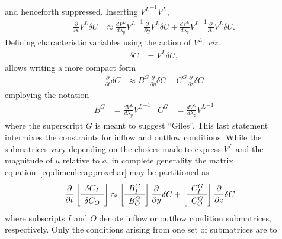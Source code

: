 and henceforth suppressed.  Inserting ${V^L}^{-1} V^L$,
\begin{align}
  \frac{\partial}{\partial{}t}
  V^L
  \delta{}U
  &\approx
  \frac{dV^L}{d\lambda_y}
  {V^L}^{-1}
  \frac{\partial}{\partial{}y}
  V^L
  \delta{}U
  +
  \frac{dV^L}{d\lambda_z}
  {V^L}^{-1}
  \frac{\partial}{\partial{}z}
  V^L
  \delta{}U
.
\end{align}
Defining characteristic variables using the action of $V^L$, \textit{viz.}
\begin{align}
  \delta{}C &= V^L \delta{}U
  ,
\end{align}
allows writing a more compact form
\begin{align}
\label{eq:dimeulerapproxchar}
  \frac{\partial}{\partial{}t}
  \delta{}C
  &\approx
  B^G
  \frac{\partial}{\partial{}y}
  \delta{}C
  +
  C^G
  \frac{\partial}{\partial{}z}
  \delta{}C
\end{align}
employing the notation
\begin{align}
\label{eq:dimeulerapproxBG}
  B^G
&=
  \frac{dV^L}{d\lambda_y}
  {V^L}^{-1}
&
  C^G
&=
  \frac{dV^L}{d\lambda_z}
  {V^L}^{-1}
\end{align}
where the superscript $G$ is meant to suggest ``Giles''.  This last statement
intermixes the constraints for inflow and outflow conditions.  While the
submatrices vary depending on the choices made to express $V^L$ and the
magnitude of $\bar{u}$ relative to $\bar{a}$, in complete generality the matrix
equation~\eqref{eq:dimeulerapproxchar} may be partitioned as
\begin{align}
\label{eq:dimeulerapproxcharpart}
\renewcommand*{\arraystretch}{1.2}
  \frac{\partial}{\partial{}t}
  \left[\begin{array}{c}\delta{}C_{I}\\\hline\delta{}C_{O}\end{array}\right]
  &\approx
\renewcommand*{\arraystretch}{1.2}
  \left[\begin{array}{c} B^G_{I} \\ \hline B^G_{O} \end{array}\right]
  \frac{\partial}{\partial{}y}
  \delta{}C
  +
  \left[\begin{array}{c} C^G_{I} \\ \hline C^G_{O} \end{array}\right]
  \frac{\partial}{\partial{}z}
  \delta{}C
\end{align}
where subscripts $I$ and $O$ denote inflow or outflow condition submatrices,
respectively.  Only the conditions arising from one set of submatrices are to
